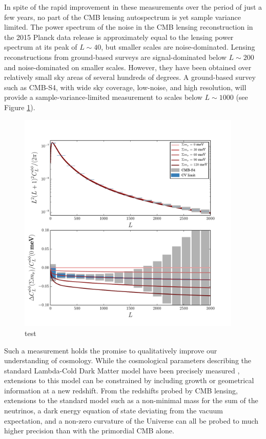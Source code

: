 In spite of the rapid improvement in these measurements over the period of just a few years, no part of the CMB lensing autospectrum is yet sample variance limited.  The  power spectrum of the noise in the CMB lensing reconstruction  in the 2015 Planck data release is approximately equal to the lensing power spectrum at its peak of $L \sim 40$, but smaller scales are noise-dominated.  Lensing reconstructions from  ground-based surveys are signal-dominated below $L \sim 200$ and noise-dominated on smaller scales.  However, they have been obtained over relatively small sky areas of several hundreds of degrees. A ground-based survey such as CMB-S4, with wide sky coverage, low-noise, and high resolution, will provide a sample-variance-limited measurement to scales below $L \sim 1000$ (see Figure \ref{Neutrinos}).  
 


\begin{figure}[h]
\includegraphics[width=0.95\textwidth]{CMBLensing/s4errors.pdf}
\caption{test}
\label{Neutrinos}
\end{figure}

 
 
Such a measurement holds the promise to qualitatively improve our understanding of cosmology.  While the cosmological parameters describing the standard Lambda-Cold Dark Matter model have been precisely measured \cite{planckpapers}, extensions to this model can be constrained by including growth or geometrical information at a new redshift.  From the redshifts probed by CMB lensing, extensions to the standard model such as a non-minimal mass for the sum of the neutrinos, a dark energy equation of state deviating from the vacuum expectation, and a non-zero curvature of the Universe can all be probed to much higher precision than with the primordial CMB alone. 



